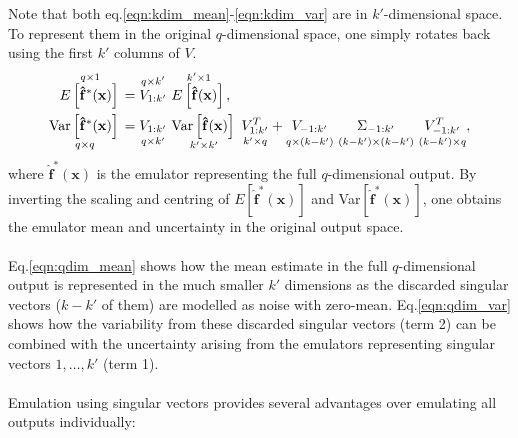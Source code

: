 \documentclass{article}
\newcommand{\numOutputs}{q}
\newcommand{\emulator}{\hat{f}}
\newcommand{\inputVec}{\mathbf{x}}
\newcommand{\RSingVecs}{V}
\newcommand{\singValMat}{\Sigma}
\newcommand{\matRank}{k}
\begin{document}
Note that both eq.\eqref{eqn:kdim_mean}-\eqref{eqn:kdim_var} are in $\matRank'$-dimensional space. To represent them in the original $\numOutputs$-dimensional space, one simply rotates back using the first $\matRank'$ columns of $\RSingVecs$.
\begin{align}
    \overset{\numOutputs \times 1}{E\left[\mathbf{\emulator}^*(\inputVec) \right] \strut}&= \overset{\numOutputs \times \matRank'}{\RSingVecs_{1:\matRank'}\strut} \ \overset{\matRank' \times 1}{E\left[\mathbf{\emulator}(\inputVec)\right] \strut},\label{eqn:qdim_mean}\\
    \underset{\numOutputs \times \numOutputs}{\text{Var}\left[\mathbf{\emulator}^*(\inputVec) \right]\strut} &= \underset{\numOutputs \times \matRank'}{\RSingVecs_{1:\matRank'}\strut} \ \underset{\matRank' \times \matRank'}{\text{Var}\left[\mathbf{\emulator}(\inputVec)\right]\strut} \ \underset{\matRank' \times \numOutputs}{\RSingVecs_{1:\matRank'}^T\strut} + \underset{\numOutputs \times (\matRank-\matRank')}{\RSingVecs_{-1:\matRank'}\strut} \ \underset{(\matRank-\matRank')\times(\matRank-\matRank')}{\singValMat_{-1:\matRank'}\strut} \ \underset{(\matRank-\matRank') \times \numOutputs}{\RSingVecs_{-1:\matRank'}^T\strut}, \label{eqn:qdim_var}
\end{align}
where $\mathbf{\emulator}^*(\inputVec)$ is the emulator representing the full $\numOutputs$-dimensional output. By inverting the scaling and centring of $E\left[\mathbf{\emulator}^*(\inputVec) \right]$ and Var$\left[\mathbf{\emulator}^*(\inputVec) \right]$, one obtains the emulator mean and uncertainty in the original output space.\\\\
Eq.\eqref{eqn:qdim_mean} shows how the mean estimate in the full $\numOutputs$-dimensional output is represented in the much smaller $\matRank'$ dimensions as the discarded singular vectors ($\matRank-\matRank'$ of them) are modelled as noise with zero-mean. Eq.\eqref{eqn:qdim_var} shows how the variability from these discarded singular vectors (term 2) can be combined with the uncertainty arising from the emulators representing singular vectors $1,\dots,\matRank'$ (term 1).\\\\
Emulation using singular vectors provides several advantages over emulating all outputs individually:
\end{document}
